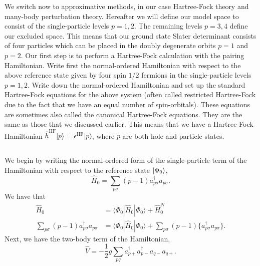 We switch now to approximative methods, in our case Hartree-Fock theory and many-body perturbation theory.
Hereafter we will define our model space to consist of the single-particle levels $p = 1, 2$.
The remaining levels $p = 3, 4$ define our excluded space.
This means that our ground state Slater determinant consists of four particles which can be placed in the doubly degenerate orbits $p = 1$ and $p = 2$.
Our first step is to perform a Hartree-Fock calculation with the pairing Hamiltonian.
Write first the normal-ordered Hamiltonian with respect to the above reference state given by four spin $1/2$ fermions in the single-particle levels $p = 1, 2$.
Write down the normal-ordered Hamiltonian and set up the standard Hartree-Fock equations for the above system (often called restricted Hartree-Fock due to the fact that  we have an equal number of spin-orbitals).
These equations are sometimes also called the canonical Hartree-Fock equations.
They are the same as those that we discussed earlier.
This means that we have a Hartree-Fock Hamiltonian $\hat{h}^{\mathrm{HF}} \vert p \rangle = \epsilon^{\mathrm{HF}} \vert p \rangle$, where $p$ are both hole and particle states.

\subsection{}
We begin by writing the normal-ordered form of the single-particle term of the Hamiltonian with respect to the reference state $\lvert\Phi_0\rangle$,
\begin{equation*}
    \hat{H}_0 = \sum_{p\sigma} (p-1) a_{p\sigma}^\dagger a_{p\sigma}.
\end{equation*}
We have that
\begin{align*}
    \hat{H}_0 &= \langle \Phi_0 | \hat{H}_0 | \Phi_0 \rangle + \hat{H}_0^N \\
    \sum_{p\sigma} (p-1) a_{p\sigma}^\dagger a_{p\sigma} &= \langle \Phi_0 | \hat{H}_0 | \Phi_0 \rangle + \sum_{p\sigma} (p-1) \{ a_{p\sigma}^\dagger a_{p\sigma} \}.
\end{align*}
Next, we have the two-body term of the Hamiltonian,
\begin{equation*}
    \hat{V} = -\frac{1}{2} g \sum_{pq} a^{\dagger}_{p+} a^{\dagger}_{p-} a_{q-} a_{q+}.
\end{equation*}

